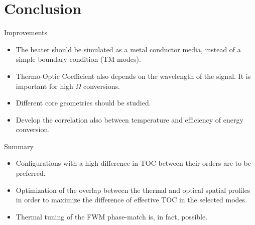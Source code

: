 \documentclass[11pt, leqno]{beamer}
\begin{document}
\section{Conclusion}
\begin{frame}{Improvements}
	\begin{itemize}
		\item	The heater should be simulated as a metal conductor media, instead of a simple boundary condition (TM modes).
		\item	Thermo-Optic Coefficient also depends on the wavelength of the signal. It is important for high $\Omega$ conversions.
		\item	Different core geometries should be studied.
		\item	Develop the correlation also between temperature and efficiency of energy conversion.
	\end{itemize}
\end{frame}
\begin{frame}{Summary}
	\begin{itemize}
		\item Configurations with a high difference in TOC between their orders are to be preferred.
		\item %
		Optimization of the overlap between the thermal and optical spatial profiles in order to maximize the difference of effective TOC in the selected modes.
		\item Thermal tuning of the FWM phase-match is, in fact, possible.
	\end{itemize}
\end{frame}
\end{document}
